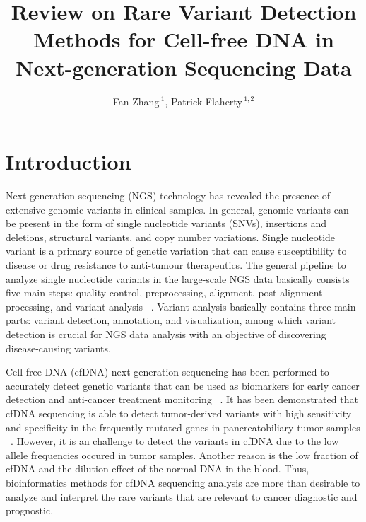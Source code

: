 \documentclass[11pt,reqno]{amsart}
\title[Review on RVD Methods in cfDNA NGS]{Review on Rare Variant Detection Methods for Cell-free DNA in Next-generation Sequencing Data}
\author[F. Zhang AND P. Flaherty]{Fan Zhang\,$^{1}$, Patrick Flaherty\,$^{1,2}$}
\begin{document}
\maketitle

\section{Introduction}
Next-generation sequencing (NGS) technology has revealed the presence of extensive genomic variants in clinical samples.
In general, genomic variants can be present in the form of single nucleotide variants (SNVs), insertions and deletions, structural variants, and copy number variations.
Single nucleotide variant is a primary source of genetic variation that can cause susceptibility to disease or drug resistance to  anti-tumour therapeutics.
The general pipeline to analyze single nucleotide variants in the large-scale NGS data basically consists five main steps: quality control, preprocessing, alignment, post-alignment processing, and variant analysis ~\citep{Bao2014}.
Variant analysis basically contains three main parts: variant detection, annotation, and visualization, among which variant detection is crucial for NGS data analysis with an objective of discovering disease-causing variants.


Cell-free DNA (cfDNA) next-generation sequencing has been performed to accurately detect genetic variants that can be used as biomarkers for early cancer detection and anti-cancer treatment monitoring ~\citep{schwarzenbach2011cell, zhou2014pilot}.
It has been demonstrated that cfDNA sequencing is able to detect tumor-derived variants with high sensitivity and specificity in the frequently mutated genes in pancreatobiliary tumor samples ~\citep{zill2015cell}.
However, it is an challenge to detect the variants in cfDNA due to the low allele frequencies occured in tumor samples.
Another reason is the low fraction of cfDNA and the dilution effect of the normal DNA in the blood. 
Thus, bioinformatics methods for cfDNA sequencing analysis are more than desirable to analyze and interpret the rare variants that are relevant to cancer diagnostic and prognostic.
\end{document}

